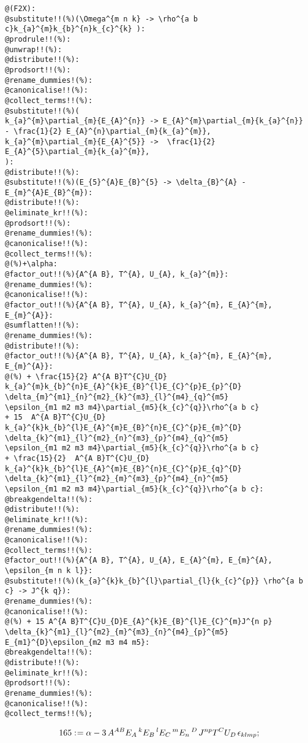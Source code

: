 \documentclass[11pt]{article}
\def\specialcolon{\mathrel{\mathop{:}}\hspace{-.5em}}
\begin{document}
{\color[named]{Blue}\begin{verbatim}
@(F2X):
@substitute!!(%)(\Omega^{m n k} -> \rho^{a b c}k_{a}^{m}k_{b}^{n}k_{c}^{k} ):
@prodrule!!(%):
@unwrap!!(%):
@distribute!!(%):
@prodsort!!(%):
@rename_dummies!(%):
@canonicalise!!(%):
@collect_terms!!(%):
@substitute!!(%)(
k_{a}^{m}\partial_{m}{E_{A}^{n}} -> E_{A}^{m}\partial_{m}{k_{a}^{n}} 
- \frac{1}{2} E_{A}^{n}\partial_{m}{k_{a}^{m}},
k_{a}^{m}\partial_{m}{E_{A}^{5}} ->  \frac{1}{2}  E_{A}^{5}\partial_{m}{k_{a}^{m}},
):
@distribute!!(%):
@substitute!!(%)(E_{5}^{A}E_{B}^{5} -> \delta_{B}^{A} - E_{m}^{A}E_{B}^{m}):
@distribute!!(%):
@eliminate_kr!!(%):
@prodsort!!(%):
@rename_dummies!(%):
@canonicalise!!(%):
@collect_terms!!(%):
@(%)+\alpha:
@factor_out!!(%){A^{A B}, T^{A}, U_{A}, k_{a}^{m}}:
@rename_dummies!(%):
@canonicalise!!(%):
@factor_out!!(%){A^{A B}, T^{A}, U_{A}, k_{a}^{m}, E_{A}^{m}, E_{m}^{A}}:
@sumflatten!!(%):
@rename_dummies!(%):
@distribute!!(%):
@factor_out!!(%){A^{A B}, T^{A}, U_{A}, k_{a}^{m}, E_{A}^{m}, E_{m}^{A}}:
@(%) + \frac{15}{2} A^{A B}T^{C}U_{D} k_{a}^{m}k_{b}^{n}E_{A}^{k}E_{B}^{l}E_{C}^{p}E_{p}^{D}
\delta_{m}^{m1}_{n}^{m2}_{k}^{m3}_{l}^{m4}_{q}^{m5}
\epsilon_{m1 m2 m3 m4}\partial_{m5}{k_{c}^{q}}\rho^{a b c} 
+ 15  A^{A B}T^{C}U_{D} k_{a}^{k}k_{b}^{l}E_{A}^{m}E_{B}^{n}E_{C}^{p}E_{m}^{D}
\delta_{k}^{m1}_{l}^{m2}_{n}^{m3}_{p}^{m4}_{q}^{m5}
\epsilon_{m1 m2 m3 m4}\partial_{m5}{k_{c}^{q}}\rho^{a b c}
+ \frac{15}{2}  A^{A B}T^{C}U_{D} k_{a}^{k}k_{b}^{l}E_{A}^{m}E_{B}^{n}E_{C}^{p}E_{q}^{D}
\delta_{k}^{m1}_{l}^{m2}_{m}^{m3}_{p}^{m4}_{n}^{m5}
\epsilon_{m1 m2 m3 m4}\partial_{m5}{k_{c}^{q}}\rho^{a b c}:
@breakgendelta!!(%):
@distribute!!(%):
@eliminate_kr!!(%):
@rename_dummies!(%):
@canonicalise!!(%):
@collect_terms!!(%):
@factor_out!!(%){A^{A B}, T^{A}, U_{A}, E_{A}^{m}, E_{m}^{A}, \epsilon_{m n k l}}:
@substitute!!(%)(k_{a}^{k}k_{b}^{l}\partial_{l}{k_{c}^{p}} \rho^{a b c} -> J^{k q}):
@rename_dummies!(%):
@canonicalise!!(%):
@(%) + 15 A^{A B}T^{C}U_{D}E_{A}^{k}E_{B}^{l}E_{C}^{m}J^{n p}
\delta_{k}^{m1}_{l}^{m2}_{m}^{m3}_{n}^{m4}_{p}^{m5}
E_{m1}^{D}\epsilon_{m2 m3 m4 m5}:
@breakgendelta!!(%):
@distribute!!(%):
@eliminate_kr!!(%):
@prodsort!!(%):
@rename_dummies!(%):
@canonicalise!!(%):
@collect_terms!!(%);
\end{verbatim}}
\begin{dmath*}[compact, spread=2pt]
165\specialcolon{}= \alpha - 3\, {A}^{A B} {E}_{A}\,^{k} {E}_{B}\,^{l} {E}_{C}\,^{m} {E}_{n}\,^{D\, } {J}^{n p} {T}^{C} {U}_{D\, } {\epsilon}_{k l m p};
\end{dmath*}
\end{document}
